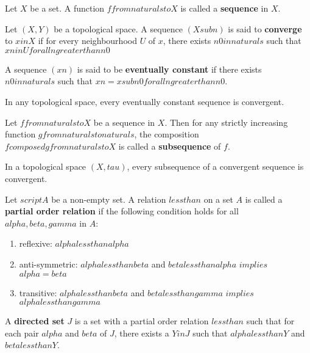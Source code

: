 \begin{defn}
    Let $X$ be a set. A function $f from naturals to X$ is called a \textbf{sequence} in $X$.
\end{defn}

\begin{defn}
    Let $(X, Y)$ be a topological space. A sequence $(X sub n)$ is said to \textbf{converge} to $x in X$ if for every neighbourhood $U$ of $x$, there exists $n0 in naturals$ such that $xn in U for all n greater than n0$
\end{defn}

\begin{defn}
    A sequence $(xn)$ is said to be \textbf{eventually constant} if there exists $n0 in naturals$ such that $xn = x sub {n0} for all n greater than n0$.
\end{defn}

\begin{thm}
    In any topological space, every eventually constant sequence is convergent.
\end{thm}

\begin{defn}
    Let $f from naturals to X$ be a sequence in $X$. Then for any strictly increasing function $g from naturals to naturals$, the composition $f composed g from naturals to X$ is called a \textbf{subsequence} of $f$.
\end{defn}

\begin{thm}
    In a topological space $(X, tau)$, every subsequence of a convergent sequence is convergent.
\end{thm}

\begin{defn}
    Let $script A$ be a non-empty set. A relation $less than$ on a set $A$ is called a \textbf{partial order relation} if the following condition holds for all $alpha, beta, gamma$ in $A$:
    \begin{enumerate}
        \item reflexive: $alpha less than alpha$
        \item anti-symmetric: $alpha less than beta$ and $beta less than alpha$ $implies$ $alpha = beta$
        \item transitive: $alpha less than beta$ and $beta less than gamma$ $implies$ $alpha less than gamma$
    \end{enumerate}
\end{defn}

\begin{defn}
    A \textbf{directed set} $J$ is a set with a partial order relation $less than$ such that for each pair $alpha$ and $beta$ of $J$, there exists a $Y in J$ such that $alpha less than Y$ and $beta less than Y$.
\end{defn}

